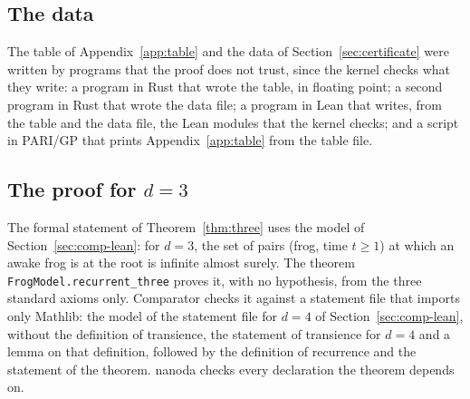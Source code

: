 \documentclass[11pt]{amsart}
\theoremstyle{definition}
\numberwithin{equation}{section}
\newcommand{\computed}[1]{\ignorespaces}
\begin{document}
\subsection{The data}\label{sec:comp-data}\computed{code/table/run_table.sh, code/table/out/iterates.out, code/certificate/run_gen.sh, code/certificate/out/gen.out, code/g3k/G3Tool/MainK.lean, code/gp/table_tex.gp}
The table of Appendix~\ref{app:table} and the data of Section~\ref{sec:certificate} were written by programs that the proof does not trust, since the kernel checks what they write: a program in Rust that wrote the table, in floating point; a second program in Rust that wrote the data file; a program in Lean that writes, from the table and the data file, the Lean modules that the kernel checks; and a script in PARI/GP that prints Appendix~\ref{app:table} from the table file.

\subsection{The proof for $d=3$}\label{sec:comp-three}
The formal statement of Theorem~\ref{thm:three} uses the model of Section~\ref{sec:comp-lean}: for $d=3$, the set of pairs (frog, time $t\ge1$) at which an awake frog is at the root is infinite almost surely. The theorem \texttt{FrogModel.recurrent\_three} proves it, with no hypothesis, from the three standard axioms only. Comparator checks it against a statement file that imports only Mathlib\computed{FrogModel/ChallengeRecurrent.lean}: the model of the statement file for $d=4$ of Section~\ref{sec:comp-lean}, without the definition of transience, the statement of transience for $d=4$ and a lemma on that definition, followed by the definition of recurrence and the statement of the theorem. nanoda checks every declaration the theorem depends on.\computed{records/comparator/run_comparator.sh, records/comparator/out/comparator.txt}
\end{document}
